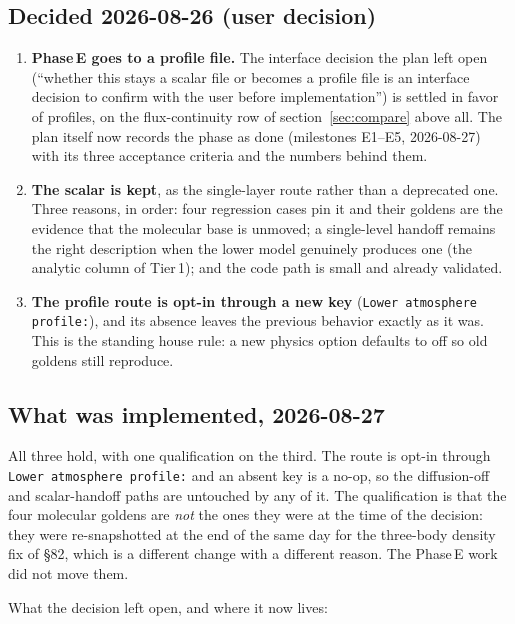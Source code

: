 \documentclass[english,a4paper]{my_memo}
\begin{document}
\subsection{Decided 2026-08-26 (user decision)}

\begin{enumerate}
\item \textbf{Phase\,E goes to a profile file.} The interface decision the
  plan left open (``whether this stays a scalar file or becomes a profile
  file is an interface decision to confirm with the user before
  implementation'') is settled in favor of profiles, on the flux-continuity
  row of section~\ref{sec:compare} above all. The plan itself now records
  the phase as done (milestones E1--E5, 2026-08-27) with its three
  acceptance criteria and the numbers behind them.
\item \textbf{The scalar  is kept}, as the single-layer
  route rather than a deprecated one. Three reasons, in order: four
  regression cases pin it and their goldens are the evidence that the
  molecular base is unmoved; a single-level handoff remains the right
  description when the lower model genuinely produces one (the analytic
  column of Tier\,1); and the code path is small and already validated.
\item \textbf{The profile route is opt-in through a new key}
  (\verb|Lower atmosphere profile:|), and its
  absence leaves the previous behavior exactly as it was. This is the
  standing house rule: a new physics option defaults to off so old
  goldens still reproduce.
\end{enumerate}

\subsection{What was implemented, 2026-08-27}

All three hold, with one qualification on the third. The route is opt-in
through \verb|Lower atmosphere profile:| and an absent key is a no-op, so
the diffusion-off and scalar-handoff paths are untouched by any of it. The
qualification is that the four molecular goldens are \emph{not} the ones
they were at the time of the decision: they were re-snapshotted at the end
of the same day for the three-body density fix of
 \S82, which is a different change with a
different reason. The Phase\,E work did not move them.

What the decision left open, and where it now lives:
\end{document}
